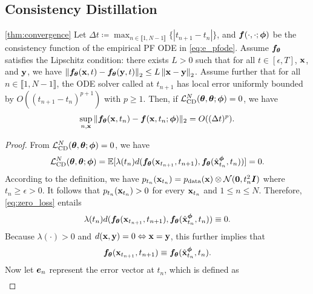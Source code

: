 \begin{appendices}
\subsection{Consistency Distillation}\label{app:proof_cd}
\begin{customthm}{\ref{thm:convergence}}
Let $\Delta t \coloneqq \max_{n \in \llbracket 1, N-1\rrbracket}\{|t_{n+1} - t_{n}|\}$, and ${\bm{f}}(\cdot,\cdot;{\bm{\phi}})$ be the consistency function of the empirical PF ODE in \cref{eq:e_pfode}. Assume ${\bm{f}}_{\bm{\theta}}$ satisfies the Lipschitz condition: there exists $L > 0$ such that for all $t \in [\epsilon, T]$, ${\mathbf{x}}$, and ${\mathbf{y}}$, we have $\left\lVert{\bm{f}}_{\bm{\theta}}({\mathbf{x}}, t) - {\bm{f}}_{\bm{\theta}}({\mathbf{y}}, t)\right\rVert_2 \leq L \left\lVert{\mathbf{x}} - {\mathbf{y}}\right\rVert_2$. Assume further that for all $n \in \llbracket 1, N-1 \rrbracket$, the ODE solver called at $t_{n+1}$ has local error uniformly bounded by $O((t_{n+1} - t_n)^{p+1})$ with $p\geq 1$. Then, if $\mathcal{L}_\text{CD}^N({\bm{\theta}}, {\bm{\theta}}; {\bm{\phi}}) = 0$, we have
\begin{align*}
    \sup_{n, {\mathbf{x}}}\|{\bm{f}}_{{\bm{\theta}}}({\mathbf{x}}, t_n) - {\bm{f}}({\mathbf{x}}, t_n; {\bm{\phi}})\|_2 = O((\Delta t)^p).
\end{align*}
\end{customthm}
\begin{proof}
    From $\mathcal{L}_\text{CD}^N({\bm{\theta}}, {\bm{\theta}}; {\bm{\phi}}) = 0$, we have
    \begin{align}
        \mathcal{L}_\text{CD}^N({\bm{\theta}}, {\bm{\theta}}; {\bm{\phi}}) = \mathbb{E}[\lambda(t_n) d({\bm{f}}_{\bm{\theta}}({{\mathbf{x}}}_{t_{n+1}}, t_{n+1}), {\bm{f}}_{{\bm{\theta}}}(\hat{{\mathbf{x}}}_{t_n}^{\bm{\phi}}, t_n))] = 0.\label{eq:zero_loss}
    \end{align}
    According to the definition, we have $p_{t_n}({\mathbf{x}}_{t_n}) = p_\text{data}({\mathbf{x}}) \otimes \mathcal{N}(\bm{0}, t_n^2 {\bm{I}})$ where $t_n \geq \epsilon > 0$. It follows that $p_{t_n}({\mathbf{x}}_{t_n}) > 0$ for every ${\mathbf{x}}_{t_n}$ and $1 \leq n \leq N$. Therefore, \cref{eq:zero_loss} entails
    \begin{align}
        \lambda(t_n) d({\bm{f}}_{\bm{\theta}}({{\mathbf{x}}}_{t_{n+1}}, t_{n+1}), {\bm{f}}_{{\bm{\theta}}}(\hat{{\mathbf{x}}}_{t_n}^{\bm{\phi}}, t_n)) \equiv 0.
    \end{align}
    Because $\lambda(\cdot) > 0$ and $d({\mathbf{x}}, {\mathbf{y}}) = 0 \Leftrightarrow {\mathbf{x}} = {\mathbf{y}}$, this further implies that
    \begin{align}
        {\bm{f}}_{\bm{\theta}}({\mathbf{x}}_{t_{n+1}}, t_{n+1}) \equiv {\bm{f}}_{{\bm{\theta}}}(\hat{{\mathbf{x}}}_{t_n}^{\bm{\phi}}, t_n).\label{eq:zero_loss_identity}
    \end{align}
    Now let ${\bm{e}}_{n}$ represent the error vector at $t_n$, which is defined as
    \begin{align*}

\end{align*}
\end{proof}
\end{appendices}
